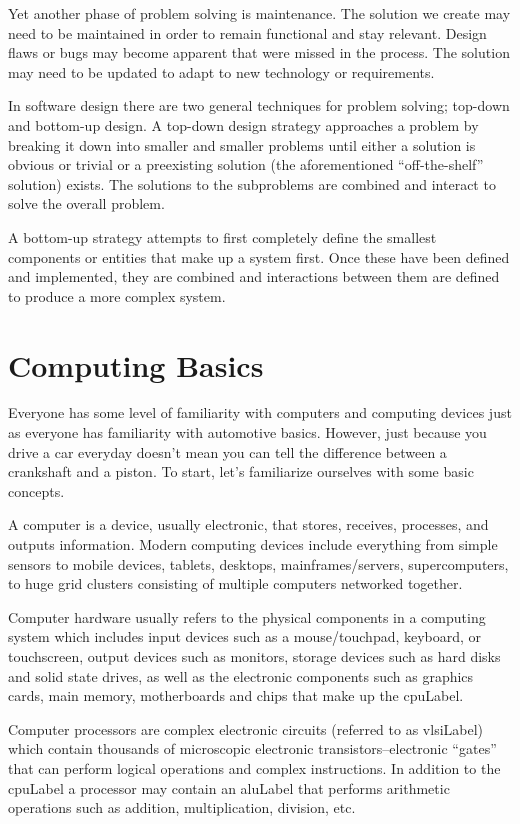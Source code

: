 Yet another phase of problem solving is maintenance.  The solution
we create may need to be maintained in order to remain functional
and stay relevant.  Design flaws or bugs may become apparent that
were missed in the process.  The solution may need to be updated
to adapt to new technology or requirements.  

In software design there are two general techniques for problem solving;
top-down and bottom-up design.  A \gls{top-down design} strategy approaches a problem
by breaking it down into smaller and smaller problems until either a solution
is obvious or trivial or a preexisting solution (the aforementioned ``off-the-shelf'' 
solution) exists.  The solutions to the subproblems are combined and
interact to solve the overall problem.

A bottom-up strategy attempts to first completely define the smallest
components or entities that make up a system first.  Once these have
been defined and implemented, they are combined and interactions
between them are defined to produce a more complex system.

\section{Computing Basics}

Everyone has some level of familiarity with computers and computing 
devices just as everyone has familiarity with automotive basics.  However, 
just because you drive a car everyday doesn't mean you can tell the 
difference between a crankshaft and a piston.  To start, let's familiarize
ourselves with some basic concepts.

A computer is a device, usually electronic, that stores, receives, 
processes, and outputs information.  Modern computing devices include
everything from simple sensors to mobile devices, tablets, desktops, 
mainframes/servers, supercomputers, to huge grid clusters consisting
of multiple computers networked together.

Computer hardware usually refers to the physical components in a 
computing system which includes input devices such as a mouse/touchpad, 
keyboard, or touchscreen, output devices such as monitors, storage 
devices such as hard disks and solid state drives, as well as the
electronic components such as graphics cards, main memory, motherboards and
chips that make up the \gls{cpuLabel}.

Computer processors are complex electronic circuits (referred to as
\gls{vlsiLabel}) which contain thousands of 
microscopic electronic transistors--electronic ``gates'' that can perform
logical operations and complex instructions.  In addition to the \gls{cpuLabel}
a processor may contain an \gls{aluLabel} that performs arithmetic 
operations such as addition, multiplication, division, etc.


